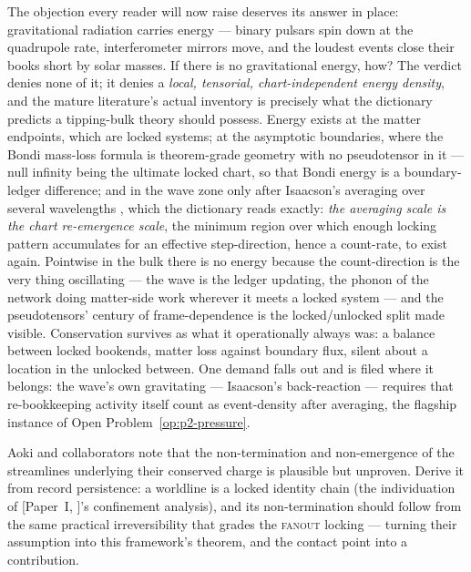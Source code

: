 \documentclass[11pt,a4paper]{article}
\newcommand{\Pone}[1]{[Paper~I, #1]} %
\newcommand{\fanout}{\textsc{fanout}}
\begin{document}
The objection every reader will now raise deserves its answer in place: gravitational radiation
carries energy --- binary pulsars spin down at the quadrupole rate, interferometer mirrors move,
and the loudest events close their books short by solar masses. If there is no gravitational
energy, how? The verdict denies none of it; it denies a \emph{local, tensorial, chart-independent
energy density}, and the mature literature's actual inventory is precisely what the dictionary
predicts a tipping-bulk theory should possess. Energy exists at the matter endpoints, which are
locked systems; at the asymptotic boundaries, where the Bondi mass-loss formula is theorem-grade
geometry with no pseudotensor in it \autocite{bondivanderburgmetzner1962} --- null infinity being
the ultimate locked chart, so that Bondi energy is a boundary-ledger difference; and in the wave
zone only after Isaacson's averaging over several wavelengths
\autocite{isaacson1968gravitational}, which the dictionary reads exactly: \emph{the averaging
scale is the chart re-emergence scale}, the minimum region over which enough locking pattern
accumulates for an effective step-direction, hence a count-rate, to exist again. Pointwise in the
bulk there is no energy because the count-direction is the very thing oscillating --- the wave is
the ledger updating, the phonon of the network doing matter-side work wherever it meets a locked
system --- and the pseudotensors' century of frame-dependence is the locked/unlocked split made
visible. Conservation survives as what it operationally always was: a balance between locked
bookends, matter loss against boundary flux, silent about a location in the unlocked between. One
demand falls out and is filed where it belongs: the wave's own gravitating --- Isaacson's
back-reaction --- requires that re-bookkeeping activity itself count as event-density after
averaging, the flagship instance of Open Problem~\ref{op:p2-pressure}.

\begin{openproblem}\label{op:p2-worldlines}
Aoki and collaborators note that the non-termination and non-emergence of the streamlines
underlying their conserved charge is plausible but unproven. Derive it from record persistence:
a worldline is a locked identity chain (the individuation of \Pone{}'s confinement analysis), and
its non-termination should follow from the same practical irreversibility that grades the
\fanout{} locking --- turning their assumption into this framework's theorem, and the contact
point into a contribution.
\end{openproblem}
\end{document}
